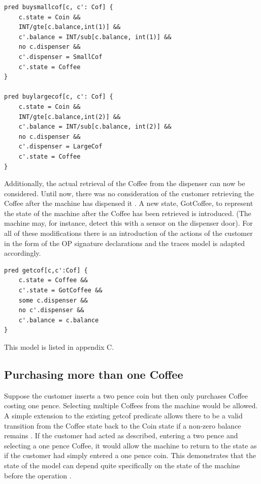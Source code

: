 \documentclass[a4paper,12pt]{report}
\begin{document}
\begin{verbatim}
pred buysmallcof[c, c': Cof] {
	c.state = Coin &&
	INT/gte[c.balance,int(1)] &&
	c'.balance = INT/sub[c.balance, int(1)] &&
	no c.dispenser &&
	c'.dispenser = SmallCof
	c'.state = Coffee
}

pred buylargecof[c, c': Cof] {
	c.state = Coin &&
	INT/gte[c.balance,int(2)] &&
	c'.balance = INT/sub[c.balance, int(2)] &&
	no c.dispenser &&
	c'.dispenser = LargeCof
	c'.state = Coffee
}
\end{verbatim}

 Additionally, the actual retrieval of the Coffee from the dispenser can now be considered. Until now, there was no consideration of the customer retrieving the Coffee after the machine has dispensed it \cite{RussellBoyatt}. A new state, GotCoffee, to represent the state of the machine after the Coffee has been retrieved is introduced. (The machine may, for instance, detect this with a sensor on the dispenser door). For all of these modifications there is an introduction of the actions of the customer in the form of the OP signature declarations and the traces model is adapted accordingly\cite{RussellBoyatt}.
 
\begin{verbatim}
pred getcof[c,c':Cof] {
	c.state = Coffee &&
	c'.state = GotCoffee &&
	some c.dispenser &&
	no c'.dispenser &&
	c'.balance = c.balance
}
\end{verbatim}

 This model is listed in appendix C.
 
\subsection{Purchasing more than one Coffee}
\label{Purchasing more than one coffee}

Suppose the customer inserts a two pence coin but then only purchases Coffee costing one pence. Selecting multiple Coffees from the machine would be allowed. A simple extension to the existing getcof predicate allows there to be a valid transition from the Coffee state back to the Coin state if a non-zero balance remains \cite{RussellBoyatt}. If the customer had acted as described, entering a two pence and selecting a one pence Coffee, it would allow the machine to return to the state as if the customer had simply entered a one pence coin. This demonstrates that the state of the model can depend quite specifically on the state of the machine before the operation \cite{RussellBoyatt}.
\end{document}
